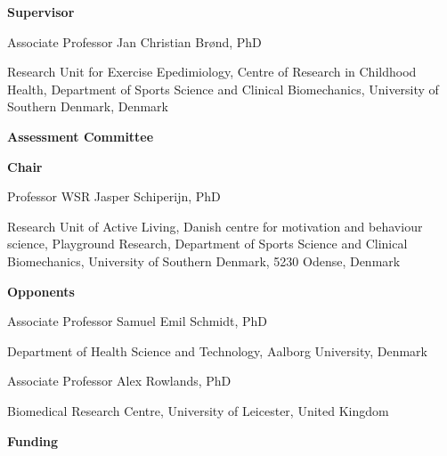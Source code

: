 \documentclass[
  10pt,
]{scrbook}
\author{}
\date{}
\let\originaltextbf\textbf
\renewcommand{\textbf}[1]{\textcolor{color1}{\originaltextbf{#1}}}
\begin{document}
  \frontmatter
  
  



\newpage

\textcolor{color1}{\textsf{\textbf{\Large{Supervisor}}}}

\vspace*{\baselineskip}

Associate Professor Jan Christian Brønd, PhD

Research Unit for Exercise Epedimiology, Centre of Research in Childhood Health, Department of Sports Science and Clinical Biomechanics, University of Southern Denmark, Denmark

\vspace{2cm}

\textcolor{color1}{\textsf{\textbf{\Large{Assessment Committee}}}}

\vspace*{\baselineskip}

\textcolor{color1}{\textbf{Chair}}

Professor WSR Jasper Schiperijn, PhD

Research Unit of Active Living, Danish centre for motivation and behaviour science, Playground Research, Department of Sports Science and Clinical Biomechanics, University of Southern Denmark, 5230 Odense, Denmark

\bigskip

\textcolor{color1}{\textbf{Opponents}}

\begin{multicols}{2}

Associate Professor Samuel Emil Schmidt, PhD

Department of Health Science and Technology, \newline Aalborg University, Denmark

\columnbreak

Associate Professor Alex Rowlands, PhD

Biomedical Research Centre, \newline University of Leicester, United Kingdom

\end{multicols}

\vspace{2cm}

\textcolor{color1}{\textsf{\textbf{\Large{Funding}}}}

\vspace*{\baselineskip}
\end{document}
